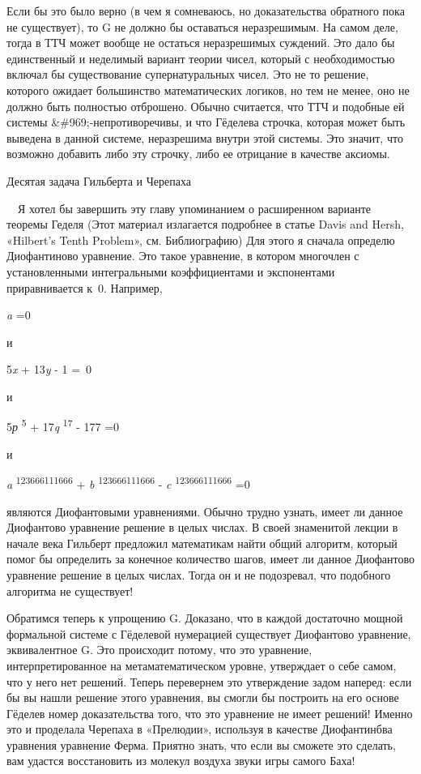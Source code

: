 \documentclass[../main.tex]{subfiles}
\begin{document}
Если бы это было верно (в чем я сомневаюсь, но доказательства обратного пока не существует), то G не должно бы оставаться неразрешимым. На самом деле, тогда в ТТЧ может вообще не остаться неразрешимых суждений. Это дало бы единственный и неделимый вариант теории чисел, который с необходимостью включал бы существование супернатуральных чисел. Это не то решение, которого ожидает большинство математических логиков, но тем не менее, оно не должно быть полностью отброшено. Обычно считается, что ТТЧ и подобные ей системы \&\#969;-непротиворечивы, и что Гёделева строчка, которая может быть выведена в данной системе, неразрешима внутри этой системы. Это значит, что возможно добавить либо эту строчку, либо ее отрицание в качестве аксиомы.

Десятая задача Гильберта и Черепаха

~~Я хотел бы завершить эту главу упоминанием о расширенном варианте теоремы Геделя (Этот материал излагается подробнее в статье Davis and Hersh, «Hilbert's Tenth Problem», см. Библиографию) Для этого я сначала определю Диофантиново уравнение. Это такое уравнение, в котором многочлен с установленными интегральными коэффициентами и экспонентами приравнивается к~0. Например,

\emph{a} =0

и

5\emph{x} + 13\emph{y} - 1 =~0

и

5\emph{р} \textsuperscript{5} + 17\emph{q} \textsuperscript{17} - 177 =0

и

\emph{a} \textsuperscript{123666111666} + \emph{b} \textsuperscript{123666111666} - \emph{c} \textsuperscript{123666111666} =0

являются Диофантовыми уравнениями. Обычно трудно узнать, имеет ли данное Диофантово уравнение решение в целых числах. В своей знаменитой лекции в начале века Гильберт предложил математикам найти общий алгоритм, который помог бы определить за конечное количество шагов, имеет ли данное Диофантово уравнение решение в целых числах. Тогда он и не подозревал, что подобного алгоритма не существует!

Обратимся теперь к упрощению G. Доказано, что в каждой достаточно мощной формальной системе с Гёделевой нумерацией существует Диофантово уравнение, эквивалентное G. Это происходит потому, что это уравнение, интерпретированное на метаматематическом уровне, утверждает о себе самом, что у него нет решений. Теперь перевернем это утверждение задом наперед: если бы вы нашли решение этого уравнения, вы смогли бы построить на его основе Гёделев номер доказательства того, что это уравнение не имеет решений! Именно это и проделала Черепаха в «Прелюдии», используя в качестве Диофантинбва уравнения уравнение Ферма. Приятно знать, что если вы сможете это сделать, вам удастся восстановить из молекул воздуха звуки игры самого Баха!
\end{document}

